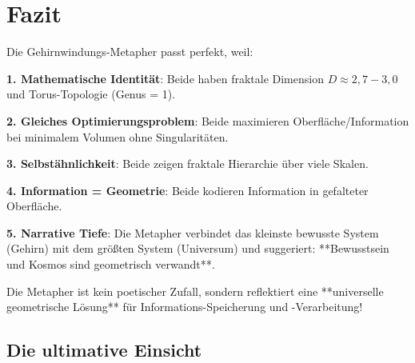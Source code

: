 	\section{Fazit}
	
	\begin{keyresult}
		Die Gehirnwindungs-Metapher passt perfekt, weil:
		
		\vspace{0.3cm}
		
		\textbf{1. Mathematische Identität}:
		Beide haben fraktale Dimension $D \approx 2,7 - 3,0$ und Torus-Topologie (Genus = 1).
		
		\vspace{0.3cm}
		
		\textbf{2. Gleiches Optimierungsproblem}:
		Beide maximieren Oberfläche/Information bei minimalem Volumen ohne Singularitäten.
		
		\vspace{0.3cm}
		
		\textbf{3. Selbstähnlichkeit}:
		Beide zeigen fraktale Hierarchie über viele Skalen.
		
		\vspace{0.3cm}
		
		\textbf{4. Information = Geometrie}:
		Beide kodieren Information in gefalteter Oberfläche.
		
		\vspace{0.3cm}
		
		\textbf{5. Narrative Tiefe}:
		Die Metapher verbindet das kleinste bewusste System (Gehirn) mit dem größten System (Universum) und suggeriert: **Bewusstsein und Kosmos sind geometrisch verwandt**.
		
		\vspace{0.3cm}
		
		Die Metapher ist kein poetischer Zufall, sondern reflektiert eine **universelle geometrische Lösung** für Informations-Speicherung und -Verarbeitung!
	\end{keyresult}
	
	\subsection{Die ultimative Einsicht}
	
